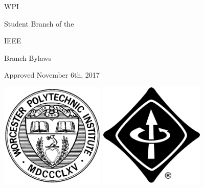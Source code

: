 \begin{center}

\LARGE{\acrlong{WPI}}

\vspace{0.5cm}

\large{Student Branch of the}

\vspace{0.25cm}

\LARGE{\acrlong{IEEE}}

\vspace{2cm}

\Huge{\Gls{Branch} \Glspl{Bylaw}}

\hrulefill

\vspace{0.5cm}

\LARGE{Approved November 6th, 2017}

\vspace{4cm}

\includegraphics[height=5cm]{titlepage/img/WPI.png}
\hspace{2cm}
\includegraphics[height=5cm]{titlepage/img/IEEE.png}

\end{center}
